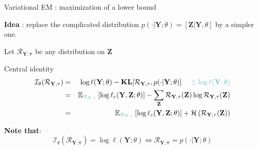 \documentclass[compress,10pt]{beamer}
\newcommand{\bX}{\mathbf{Y}}
\newcommand{\Xall}{\mathbf{Y}}
\newcommand{\Zall}{\mathbf{Z}}
\newcommand{\btau}{\mathbf{\tau}}
\newcommand{\bZ}{\mathbf{Z}}
\begin{document}
 \begin{frame}{Variational EM  : maximization of a lower bound}


\textcolor{dgreen}{\textbf{Idea}} : replace the complicated distribution $p(\cdot | \Xall; \theta) = [\bZ | \bX, \theta]$ by a simpler one. 


Let $\mathcal{R}_{\Xall,\btau}$ be any distribution on   $\Zall$


\begin{block}{Central identity}
\begin{eqnarray*}
\mathcal{I}_{\theta}(\mathcal{R}_{\Xall,\btau}) &=& \log \ell(\Xall ; \theta) -   \mathbf{KL}[\mathcal{R}_{\Xall,\btau}, p(\cdot | \Xall; \theta)] \color{dgreen}\quad \leq   \log \ell(\Xall ; \theta)   \\
&=& \mathbb{E}_{\color{dgreen}\mathcal{R}_{\Xall,\btau}} \left[\log \ell_c(\bX,\bZ; \theta)   \right]  -   \sum_{\Zall} \mathcal{R}_{\Xall,\btau}(\bZ)  \log \mathcal{R}_{\Xall,\btau}({\bZ}) \\
&=& \mathbb{E}_{\color{dgreen}\mathcal{R}_{\Xall,\btau}} \left[\log \ell_c(\bX,\bZ; \theta)   \right]  +  \mathcal{H}\left(\mathcal{R}_{\Xall,\btau}(\bZ)\right) 
\end{eqnarray*}
\end{block} 

\textbf{Note that}:  
$$\mathcal{I}_{\theta}(\mathcal{R}_{\Xall,\btau})  = \log \ell(\Xall; \theta) \Leftrightarrow \mathcal{R}_{\Xall,\btau} = p(\cdot | \Xall; \theta)$$ 


\end{frame}
\end{document}
